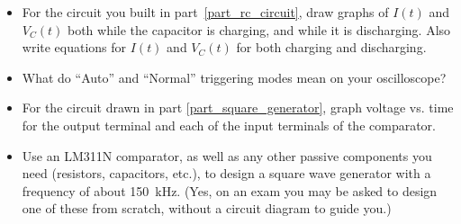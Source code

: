 \begin{itemize}


\item For the circuit you built in part~\ref{part_rc_circuit}, draw graphs of $I(t)$ and $V_C(t)$ both while the capacitor is charging, and while it is discharging.  Also write equations for $I(t)$ and $V_C(t)$ for both charging and discharging.

\item What do ``Auto'' and ``Normal'' triggering modes mean on your oscilloscope?

\item For the circuit drawn in part \ref{part_square_generator}, graph voltage vs. time for the output terminal and each of the input terminals of the comparator.


\item Use an LM311N comparator, as well as any other passive components you need (resistors, capacitors, etc.), to design a square wave generator with a frequency of about 150~kHz.  (Yes, on an exam you may be asked to design one of these from scratch, without a circuit diagram to guide you.)

\end{itemize}






\